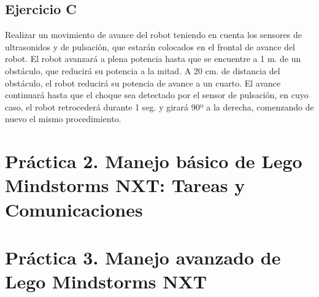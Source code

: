 \section{Ejercicio C}

\par Realizar un movimiento de avance del robot teniendo en cuenta los sensores de ultrasonidos y de pulsación, 
que estarán colocados en el frontal de avance del robot. El robot avanzará a plena potencia hasta que se encuentre 
a 1 m. de un obstáculo, que reducirá su potencia a la mitad. A 20 cm. de distancia del obstáculo, el robot reducirá 
su potencia de avance a un cuarto. El avance continuará hasta que el choque sea detectado por el sensor de pulsación, 
en cuyo caso, el robot retrocederá durante 1 seg. y girará 90º a la derecha, comenzando de nuevo el mismo procedimiento.




\chapter{Práctica 2. Manejo básico de Lego Mindstorms NXT: Tareas y Comunicaciones}

\chapter{Práctica 3. Manejo avanzado de Lego Mindstorms NXT}